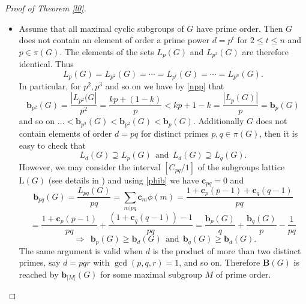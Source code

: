\documentclass{amsart}
\theoremstyle{definition}
\numberwithin{equation}{section}
\begin{document}
\begin{proof}[Proof of Theorem \ref{l0}]
\begin{itemize}
\item [Case 1.] Assume that all maximal cyclic subgroups of $G$ have prime order. Then $G$ does not contain an element of order a prime power $d=p^t$ for $2 \le t \le n$ and $p \in \pi(G)$. The elements of the sets $L_p(G)$ and $L_{p^2}(G)$ are therefore identical. Thus \begin{equation} \label{00} 
 L_p(G)=L_{p^2}(G)= \cdots = L_{p^t}(G)= \cdots= L_{p^n}(G). \end{equation}
 In particular, for $p^2, p^3$ and so on we have by \eqref{npp} that 
\begin{equation} \mathbf{b}_{p^2}(G)=\frac{|L_{p^2}(G|}{p^2}   = \frac{kp + (1-k)}{p}  < kp+1-k = \frac{|L_p(G)|}{p}=\mathbf{b}_{p}(G) \end{equation}  and so on $\ldots < \mathbf{b}_{p^3}(G) < \mathbf{b}_{p^2}(G)  < \mathbf{b}_p(G)$. 
Additionally $G$ does not contain  elements of order  $d=pq$ for distinct primes $p,q \in \pi(G)$, then it is easy to check that  
\begin{equation} \label{eqpppp}
   L_{d}(G)\supseteq L_p(G) \ \ \mbox{and} \ \  L_{d}(G)\supseteq L_q(G).
   \end{equation}
 However, we may consider the interval $[C_{pq}/1]$ of the subgroups lattice
 $\mathrm{L}(G)$ (see details in \cite[\S 1.1, pp.5--10]{rs}) and using \eqref{phib} we have $\mathbf{c}_{pq}=0$ and
 \begin{equation} \label{eqpppp2}
   \mathbf{b}_{pq}(G)=\frac{L_{pq}(G)}{pq}={\underset{m | pq} \sum}  \mathbf{c}_m\phi(m) = \frac{1+\mathbf{c}_p(p-1)+\mathbf{c}_q(q-1)}{pq} \end{equation}
   $$= \frac{1+\mathbf{c}_p(p-1)}{pq}+ \frac{\left(1+\mathbf{c}_q(q-1)\right)-1}{pq}
   =
   \frac{\mathbf{b}_{p}(G)}{q}+\frac{\mathbf{b}_{q}(G)}{p}-\frac{1}{pq}$$ $$
 \ \ \Longrightarrow \ \ \mathbf{b}_p(G) \geq \mathbf{b}_{d}(G) \ \ \mbox{and} \ \  \mathbf{b}_q(G) \geq \mathbf{b}_{d}(G). $$
The same argument is  valid when $d$ is the product of more than two distinct primes, say $d=pqr$ with $\gcd(p,q,r)=1$, and so on. Therefore $\mathbf{B}(G)$ is reached by $\mathbf{b}_{|M|} (G)$  for some maximal subgroup $M$ of prime order.

\medskip
\medskip


\end{itemize}
\end{proof}
\end{document}
